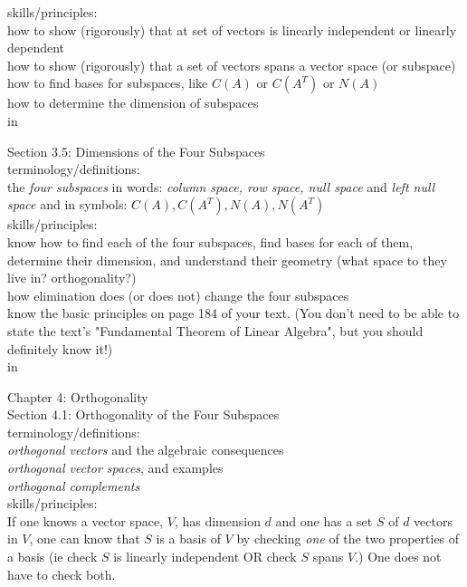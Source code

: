 \documentclass[11pt,fleqn]{article}
\begin{document}
skills/principles: \\
how to show (rigorously) that at set of vectors is linearly independent or linearly dependent\\
how to show (rigorously) that a set of vectors spans a vector space (or subspace)\\
how to find bases for subspaces, like $C(A)$ or $C(A^T)$ or $N(A)$\\
how to determine the dimension of subspaces\\

 in

\noindent Section 3.5: Dimensions of the Four Subspaces\\

terminology/definitions: \\
the \emph{four subspaces} in words: \emph{column space, row space, null space} and \emph{left null space} and in symbols: $C(A), C(A^T), N(A), N(A^T)$\\


skills/principles: \\
know how to find each of the four subspaces, find bases for each of them, determine their dimension, and understand their geometry (what space to they live in? orthogonality?)\\
how elimination does (or does not) change the four subspaces\\
know the basic principles on page 184 of your text. (You don't need to be able to state the text's "Fundamental Theorem of Linear Algebra", but you should definitely know it!)\\

 in

\noindent Chapter 4: Orthogonality\\
\noindent Section 4.1: Orthogonality of the Four Subspaces \\

terminology/definitions: \\
\emph{orthogonal vectors} and the algebraic consequences\\
\emph{orthogonal vector spaces}, and examples\\
\emph{orthogonal complements} \\

skills/principles: \\
If one knows a vector space, $V$, has dimension $d$ and one has a set $S$ of $d$ vectors in $V$, one can know that $S$ is a basis of $V$ by checking \emph{one} of the two properties of a basis (ie check $S$ is linearly independent  OR check $S$ spans $V.$) One does not have to check both.
\end{document}
